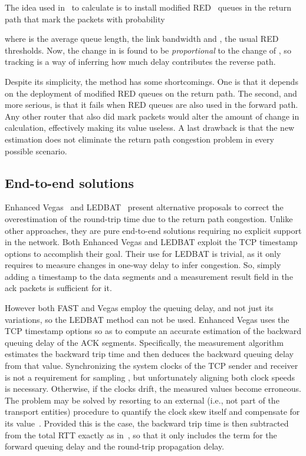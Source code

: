 \documentclass[english,times]{ettauth}
\begin{document}
The idea used in~\cite{Liu05} to calculate  is to install
modified RED~\cite{Floyd93} queues in the return path that mark the packets
with probability

where  is the average queue length,  the link bandwidth and
,  the usual RED thresholds. Now, the
change in  is found to be \emph{proportional} to the change of
, so tracking  is a way of inferring how
much delay contributes the reverse path.

Despite its simplicity, the method has some shortcomings. One is that it
depends on the deployment of modified RED queues on the return path. The
second, and more serious, is that it fails when RED queues are also used in
the forward path. Any other router that also did mark packets would alter the
amount of change in  calculation, effectively making its
value useless. A last drawback is that the new estimation  does not
eliminate the return path congestion problem in every possible scenario.

\subsection{End-to-end solutions}
\label{sec:end-end-approaches}

Enhanced Vegas~\cite{Chan03} and LEDBAT~\cite{Shalunov10} present alternative
proposals to correct the overestimation of the round-trip time due to the
return path congestion. Unlike other approaches, they are pure end-to-end
solutions requiring no explicit support in the network. Both Enhanced Vegas
and LEDBAT exploit the TCP timestamp options to accomplish their goal. Their
use for LEDBAT is trivial, as it only requires to measure changes in one-way
delay to infer congestion. So, simply adding a timestamp to the data segments
and a measurement result field in the ack packets is sufficient for it.

However both FAST and Vegas employ the queuing delay, and not just its
variations, so the LEDBAT method can not be used. Enhanced Vegas uses the TCP
timestamp options so as to compute an accurate estimation of the backward
queuing delay of the ACK segments. Specifically, the measurement algorithm
estimates the backward trip time  and then deduces the backward
queuing delay from that value. Synchronizing the system clocks of the TCP
sender and receiver is not a requirement for sampling , but
unfortunately aligning both clock speeds is necessary. Otherwise, if the
clocks drift, the measured values become erroneous. The problem may be solved
by resorting to an external (i.e., not part of the transport entities)
procedure to quantify the clock skew itself and compensate for its
value~\cite{Moon99,Zhang02}. Provided this is the case, the backward trip time
is then subtracted from the total RTT  exactly
as in~\cite{Liu05}, so that it only includes the term for the forward queuing
delay and the round-trip propagation delay.
\end{document}
